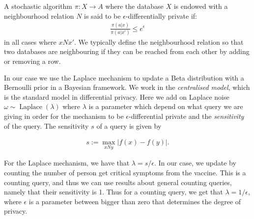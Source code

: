 A stochastic algorithm $\pi : X \rightarrow A$ where the database $X$ is endowed with a neighbourhood relation $N$ is said to be $\epsilon$-differentially private if:
\begin{align*}
    \frac{\pi(a|x)}{\pi(a|x')} \leq e^\epsilon
\end{align*}
in all cases where $xNx'$. We typically define the neighbourhood relation so that two databases are neighbouring if they can be reached from each other by adding or removing a row. 
    
In our case we use the Laplace mechanism to update a Beta distribution with a Bernoulli prior in a Bayesian framework. We work in the \emph{centralised model}, which is the standard model in differential privacy. Here we add on Laplace noise $\omega \sim \operatorname{Laplace}(\lambda)$ where $\lambda$ is a parameter which depend on what query we are giving in order for the mechanism to be $\epsilon$-differential private and the \emph{sensitivity} of the query. The sensitivity $s$ of a query is given by 

\begin{align*}
    s := \max_{xNy} |f(x) - f(y)|.
\end{align*}

For the Laplace mechanism, we have that $\lambda = s/\epsilon$. In our case, we update by counting the number of person get critical symptoms from the vaccine. This is a counting query, and thus we can use results about general counting queries, namely that their sensitivity is 1. Thus for a counting query, we get that $\lambda = 1/\epsilon$, where $\epsilon$ is a parameter between bigger than zero that determines the degree of privacy. 

